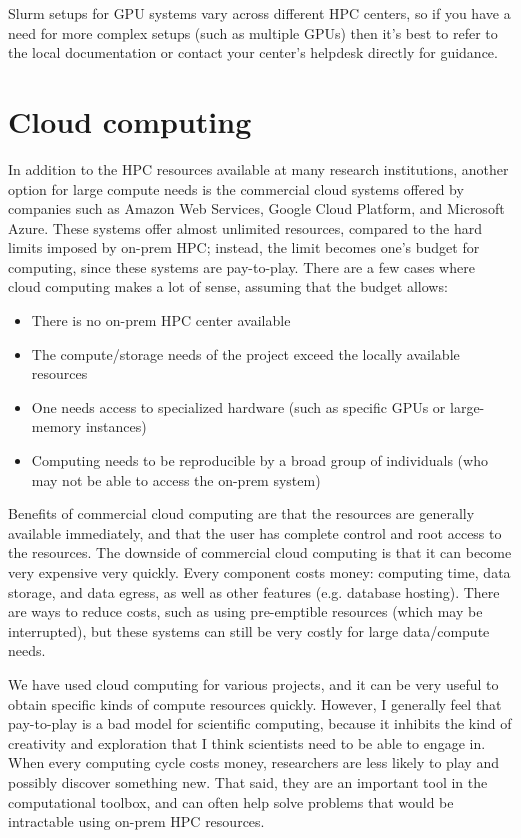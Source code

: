Slurm setups for GPU systems vary across different HPC centers, so if you have a need for more complex setups (such as multiple GPUs) then it's best to refer to the local documentation or contact your center's helpdesk directly for guidance.

\section{Cloud computing}

In addition to the HPC resources available at many research institutions, another option for large compute needs is the commercial cloud systems offered by companies such as Amazon Web Services, Google Cloud Platform, and Microsoft Azure. These systems offer almost unlimited resources, compared to the hard limits imposed by on-prem HPC; instead, the limit becomes one's budget for computing, since these systems are pay-to-play.  There are a few cases where cloud computing makes a lot of sense, assuming that the budget allows:

\begin{itemize}
\item There is no on-prem HPC center available
\item The compute/storage needs of the project exceed the locally available resources
\item One needs access to specialized hardware (such as specific GPUs or large-memory instances)
\item Computing needs to be reproducible by a broad group of individuals (who may not be able to access the on-prem system)
\end{itemize}

Benefits of commercial cloud computing are that the resources are generally available immediately, and that the user has complete control and root access to the resources.  The downside of commercial cloud computing is that it can become very expensive very quickly.  Every component costs money: computing time, data storage, and data egress, as well as other features (e.g. database hosting).  There are ways to reduce costs, such as using pre-emptible resources (which may be interrupted), but these systems can still be very costly for large data/compute needs.

We have used cloud computing for various projects, and it can be very useful to obtain specific kinds of compute resources quickly.  However, I generally feel that pay-to-play is a bad model for scientific computing, because it inhibits the kind of creativity and exploration that I think scientists need to be able to engage in.  When every computing cycle costs money, researchers are less likely to play and possibly discover something new.  That said, they are an important tool in the computational toolbox, and can often help solve problems that would be intractable using on-prem HPC resources.